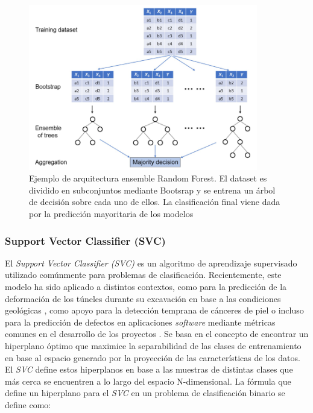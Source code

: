 \begin{figure}[H]
	\centering
	\includegraphics[width=10cm]{Figures/Background/RF.png}
	\caption{Ejemplo de arquitectura ensemble Random Forest. El dataset es dividido en subconjuntos mediante Bootsrap y se entrena un árbol de decisión sobre cada uno de ellos. La clasificación final viene dada por la predicción mayoritaria de los modelos \cite{MISRA2020243}}
	\label{RF_BACKGROUND}
\end{figure}

\subsubsection*{Support Vector Classifier (SVC)}


El \textit{Support Vector Classifier (SVC)} es un algoritmo de aprendizaje supervisado utilizado comúnmente para problemas de clasificación. Recientemente, este modelo ha sido aplicado a distintos contextos, como para la predicción de la deformación de los túneles durante su excavación en base a las condiciones geológicas \cite{zhou2022predicting}, como apoyo para la detección temprana de cánceres de piel \cite{arora2022bag} o incluso para la predicción de defectos en aplicaciones \textit{software} mediante métricas comunes en el desarrollo de los proyectos \cite{goyal2022effective}. Se basa en el concepto de encontrar un hiperplano óptimo que maximice la separabilidad de las clases de entrenamiento en base al espacio generado por la proyección de las características de los datos. El \textit{SVC} define estos hiperplanos en base a las muestras de distintas clases que más cerca se encuentren a lo largo del espacio N-dimensional. La fórmula que define un hiperplano para el \textit{SVC} en un problema de clasificación binario se define como:

